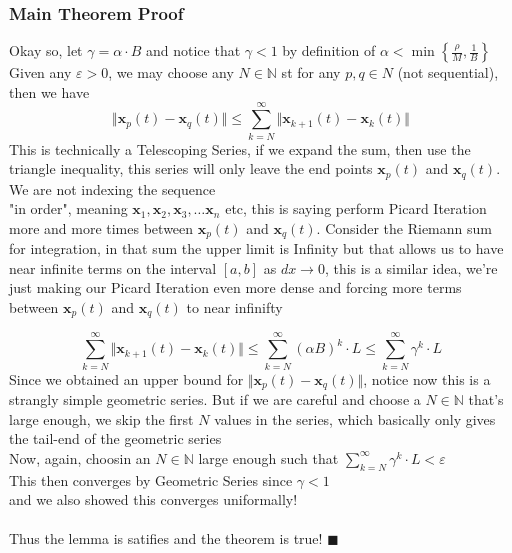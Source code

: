 \documentclass[12pt]{article}
\begin{document}
\vspace{5cm}
\subsubsection*{Main Theorem Proof}
Okay so, let $\gamma = \alpha \cdot B$ and notice that $\gamma < 1$ by definition of $\alpha < \min \left\{ \frac{\rho}{M}, \frac{1}{B} \right\}$\\
Given any $\varepsilon > 0$, we may choose any $N \in \mathbb{N}$ st for any $p,q \in N$ (not sequential), then we have
\[ \Vert \mathbf{x}_{p}(t) - \mathbf{x}_{q}(t) \Vert \leq \sum_{k=N}^{\infty} {\Vert \mathbf{x}_{k+1}(t) - \mathbf{x}_{k}(t) \Vert}\]
This is technically a Telescoping Series, if we expand the sum, then use the triangle inequality, this series will only leave the end points $\mathbf{x}_p(t)$ and $\mathbf{x}_q(t)$.
We are not indexing the sequence \\ "in order", meaning $\mathbf{x}_1,\mathbf{x}_2,\mathbf{x}_3,\ldots\mathbf{x}_n$ etc, 
this is saying perform Picard Iteration more and more times between $\mathbf{x}_p(t)$ and $\mathbf{x}_q(t)$. 
Consider the Riemann sum for integration, in that sum the upper limit is Infinity but that allows us to have near infinite terms on the interval $[a,b]$ 
as $dx \rightarrow 0$, this is a similar idea, we're just making our Picard Iteration even more dense and forcing more terms between $\mathbf{x}_p(t)$ and $\mathbf{x}_q(t)$ to near infinifty

\[ \sum_{k=N}^{\infty} {\Vert \mathbf{x}_{k+1}(t) - \mathbf{x}_{k}(t) \Vert} \leq \sum_{k=N}^{\infty} (\alpha B)^k \cdot L \leq \sum_{k=N}^{\infty} \gamma^k \cdot L\]
Since we obtained an upper bound for $\Vert \mathbf{x}_{p}(t) - \mathbf{x}_{q}(t) \Vert$, notice now this is a strangly simple geometric series.
But if we are careful and choose a $N \in \mathbb{N}$ that's large enough, we skip the first $N$ values in the series, which basically only gives the tail-end of the geometric series\\

\noindent
Now, again, choosin an $N \in \mathbb{N}$ large enough such that $\displaystyle \sum_{k=N}^{\infty} \gamma^k \cdot L < \varepsilon$\\
This then converges by Geometric Series since $\gamma < 1$ \\
and we also showed this converges uniformally!\\\\

\noindent
Thus the lemma is satifies and the theorem is true! $\blacksquare$
\end{document}
